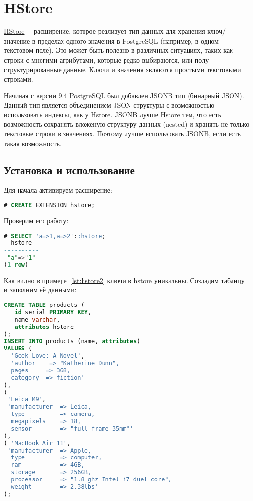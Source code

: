 \section{HStore}
\label{sec:hstore-extension}

\href{https://www.postgresql.org/docs/current/static/hstore.html}{HStore}~-- расширение, которое реализует тип данных для хранения ключ/значение в пределах одного значения в PostgreSQL (например, в одном текстовом поле). Это может быть полезно в различных ситуациях, таких как строки с многими атрибутами, которые редко выбираются, или полу-структурированные данные. Ключи и значения являются простыми текстовыми строками.

Начиная с версии 9.4 PostgreSQL был добавлен JSONB тип (бинарный JSON). Данный тип является объединением JSON структуры с возможностью использовать индексы, как у Hstore. JSONB лучше Hstore тем, что есть возможность сохранять вложеную структуру данных (nested) и хранить не только текстовые строки в значениях. Поэтому лучше использовать JSONB, если есть такая возможность.

\subsection{Установка и использование}

Для начала активируем расширение:

\begin{lstlisting}[language=SQL,label=lst:hstore1,caption=Активация hstore]
# CREATE EXTENSION hstore;
\end{lstlisting}

Проверим его работу:

\begin{lstlisting}[language=SQL,label=lst:hstore2,caption=Проверка hstore]
# SELECT 'a=>1,a=>2'::hstore;
  hstore
----------
 "a"=>"1"
(1 row)
\end{lstlisting}

Как видно в примере~\ref{lst:hstore2} ключи в hstore уникальны. Создадим таблицу и заполним её данными:

\begin{lstlisting}[language=SQL,label=lst:hstore3,caption=Проверка hstore]
CREATE TABLE products (
   id serial PRIMARY KEY,
   name varchar,
   attributes hstore
);
INSERT INTO products (name, attributes)
VALUES (
  'Geek Love: A Novel',
  'author    => "Katherine Dunn",
  pages     => 368,
  category  => fiction'
),
(
 'Leica M9',
 'manufacturer  => Leica,
  type          => camera,
  megapixels    => 18,
  sensor        => "full-frame 35mm"'
),
( 'MacBook Air 11',
 'manufacturer  => Apple,
  type          => computer,
  ram           => 4GB,
  storage       => 256GB,
  processor     => "1.8 ghz Intel i7 duel core",
  weight        => 2.38lbs'
);
\end{lstlisting}

